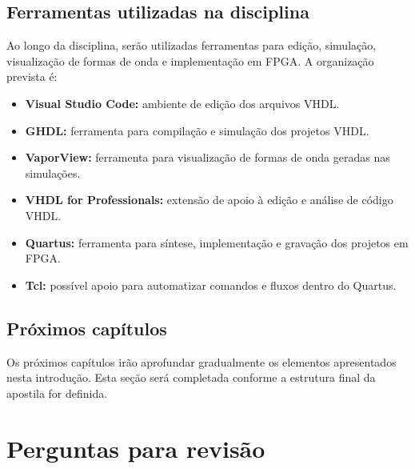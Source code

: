 \subsection{Ferramentas utilizadas na disciplina}

Ao longo da disciplina, serão utilizadas ferramentas para edição, simulação, visualização de formas de onda e implementação em FPGA. A organização prevista é:

\begin{itemize}
    \item \textbf{Visual Studio Code:} ambiente de edição dos arquivos VHDL.
    \item \textbf{GHDL:} ferramenta para compilação e simulação dos projetos VHDL.
    \item \textbf{VaporView:} ferramenta para visualização de formas de onda geradas nas simulações.
    \item \textbf{VHDL for Professionals:} extensão de apoio à edição e análise de código VHDL.
    \item \textbf{Quartus:} ferramenta para síntese, implementação e gravação dos projetos em FPGA.
    \item \textbf{Tcl:} possível apoio para automatizar comandos e fluxos dentro do Quartus.
\end{itemize}

\subsection{Próximos capítulos}

Os próximos capítulos irão aprofundar gradualmente os elementos apresentados nesta introdução. Esta seção será completada conforme a estrutura final da apostila for definida.

\section{Perguntas para revisão}

